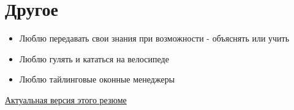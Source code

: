 \documentclass{article}
\begin{document}
    \section{Другое}
        \begin{itemize}
            \item Люблю передавать свои знания при возможности - объяснять или учить
            \item Люблю гулять и кататься на велосипеде
            \item Люблю тайлинговые оконные менеджеры
        \end{itemize}
        
    \vspace{\fill}
    \begin{center}
        \large
        \href {https://github.com/InversionSpaces/resume}{Актуальная версия этого резюме}
    \end{center}
\end{document}

